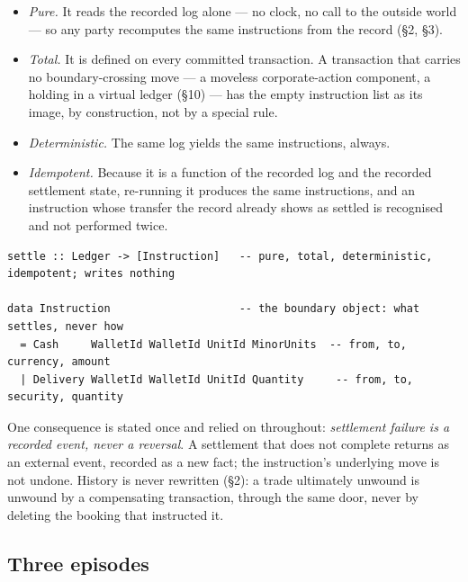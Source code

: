 \begin{itemize}[nosep]
\item \emph{Pure.} It reads the recorded log alone --- no clock, no call to the
outside world --- so any party recomputes the same instructions from the record
(\S2, \S3).
\item \emph{Total.} It is defined on every committed transaction. A transaction
that carries no boundary-crossing move --- a moveless corporate-action component, a
holding in a virtual ledger (\S10) --- has the empty instruction list as its image,
by construction, not by a special rule.
\item \emph{Deterministic.} The same log yields the same instructions, always.
\item \emph{Idempotent.} Because it is a function of the recorded log and the
recorded settlement state, re-running it produces the same instructions, and an
instruction whose transfer the record already shows as settled is recognised and
not performed twice.
\end{itemize}

\begin{lstlisting}
settle :: Ledger -> [Instruction]   -- pure, total, deterministic, idempotent; writes nothing

data Instruction                    -- the boundary object: what settles, never how
  = Cash     WalletId WalletId UnitId MinorUnits  -- from, to, currency, amount
  | Delivery WalletId WalletId UnitId Quantity     -- from, to, security, quantity
\end{lstlisting}

One consequence is stated once and relied on throughout: \emph{settlement failure
is a recorded event, never a reversal}. A settlement that does not complete returns
as an external event, recorded as a new fact; the instruction's underlying move is
not undone. History is never rewritten (\S2): a trade ultimately unwound is unwound
by a compensating transaction, through the same door, never by deleting the booking
that instructed it.

\subsection{Three episodes}

